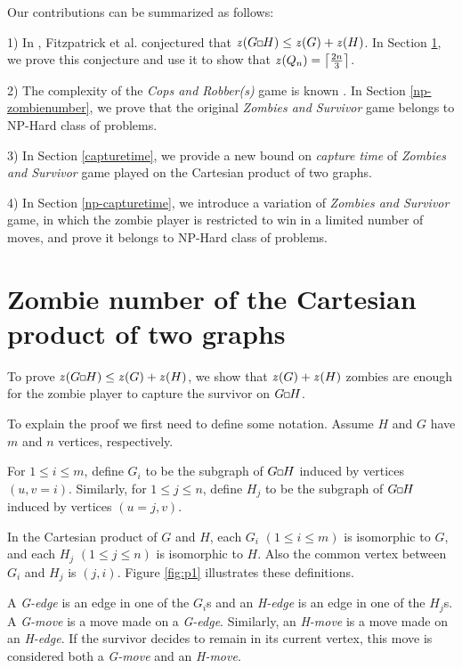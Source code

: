 \documentclass[1p]{elsarticle}
\DeclarePairedDelimiter\ceil{\lceil}{\rceil} \DeclarePairedDelimiter\floor{\lfloor}{\rfloor}
\newcommand{\zn}{\ooalign{$z$\cr\hfil\rule[.5ex]{.2em}{.08ex}\hfil\cr}}
\newcommand{\sq}[1][black]{%
\begin{tikzpicture}                                                           
  \draw[#1] (2pt,0pt) -- (6pt,0pt);   
  \draw[#1] (2pt,0pt) -- (2pt,4pt);    
  \draw[#1] (2pt,4pt) -- (6pt,4pt);   
  \draw[#1] (6pt,0pt) -- (6pt,4pt);
\end{tikzpicture}%
}
\begin{document}
Our contributions can be summarized as follows:

1) In \cite{Fitz16}, Fitzpatrick et al. conjectured that $\zn(G \sq H) \leq \zn(G) + \zn(H)$. In Section \ref{conj-proof}, we prove this conjecture and
use it to show that $\zn(Q_n) = \ceil*{\frac{2n}{3}}$. 

2) The complexity of the {\it Cops and Robber(s)} game is known \cite{Fomin10} \cite{Kinnersley15}. In Section \ref{np-zombienumber},
we prove that the original {\it Zombies and Survivor} game belongs to NP-Hard class of problems.

3) In Section \ref{capturetime}, we provide a new bound on {\it capture time} of {\it Zombies and Survivor} game played on the Cartesian
product of two graphs. 

4) In Section \ref{np-capturetime}, we introduce a variation of {\it Zombies and Survivor} game, in which the zombie
player is restricted to win in a limited number of moves, and prove it belongs to NP-Hard class of problems.




\section{Zombie number of the Cartesian product of two graphs}\label{conj-proof}

To prove $\zn(G \sq H) \leq \zn(G) + \zn(H)$, we show that $\zn(G) + \zn(H)$ zombies are enough for the zombie player to
capture the survivor on $G \sq H$.

To explain the proof we first need to define some notation. Assume $H$ and $G$ have $m$ and $n$ vertices,
respectively. 

For $1 \leq i \leq m$, define $G_i$ to be the subgraph of $G \sq H$ induced by vertices $(u,v = i)$. Similarly, for $1 \leq j \leq
n$, define $H_{j}$ to be the subgraph of $G \sq H$ induced by vertices $(u = j,v)$.

In the Cartesian product of $G$ and $H$, each $G_{i}$ $(1 \leq i \leq m)$ is isomorphic to $G$, and each $H_{j}$ $(1
\leq j \leq n)$ is isomorphic to $H$. Also the common vertex between $G_{i}$ and $H_{j}$ is $(j,i)$. Figure \ref{fig:p1}
illustrates these definitions.

A {\it G-edge} is an edge in one of the $G_{i}$s and an {\it H-edge} is an edge in one of the $H_{j}$s. A {\it G-move}
is a move made on a {\it G-edge}. Similarly, an {\it H-move} is a move made on an {\it H-edge}. If the survivor decides
to remain in its current vertex, this move is considered both a {\it G-move} and an {\it H-move}. 
\end{document}
